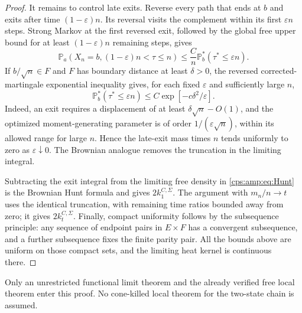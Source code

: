 \documentclass[11pt,letterpaper]{article}
\numberwithin{equation}{section}
\theoremstyle{remark}\newtheorem{remark}[theorem]{Remark}
\newcommand{\PP}{\mathbb P}
\begin{document}
\begin{proof}
It remains to control late exits. Reverse every path that ends at $b$ and exits after time $(1-\varepsilon)n$. Its reversal visits the complement within its first $\varepsilon n$ steps. Strong Markov at the first reversed exit, followed by the global free upper bound for at least $(1-\varepsilon)n$ remaining steps, gives
\begin{equation}\label{cps:amp:eq:late}
 \PP_a(X_n=b,(1-\varepsilon)n<\tau\le n)
 \le\frac Cn\PP_b^*(\tau^*\le\varepsilon n).
\end{equation}
If $b/\sqrt n\in F$ and $F$ has boundary distance at least $\delta>0$, the reversed corrected-martingale exponential inequality gives, for each fixed $\varepsilon$ and sufficiently large $n$,
\begin{equation}\label{cps:amp:eq:earlyexit}
 \PP_b^*(\tau^*\le\varepsilon n)
 \le C\exp[-c\delta^2/\varepsilon].
\end{equation}
Indeed, an exit requires a displacement of at least $\delta\sqrt n-O(1)$, and the optimized moment-generating parameter is of order $1/(\varepsilon\sqrt n)$, within its allowed range for large $n$. Hence the late-exit mass times $n$ tends uniformly to zero as $\varepsilon\downarrow0$. The Brownian analogue removes the truncation in the limiting integral.

Subtracting the exit integral from the limiting free density in \eqref{cps:amp:eq:Hunt} is the Brownian Hunt formula and gives $2k_1^{C,\Sigma}$. The argument with $m_n/n\to t$ uses the identical truncation, with remaining time ratios bounded away from zero; it gives $2k_t^{C,\Sigma}$. Finally, compact uniformity follows by the subsequence principle: any sequence of endpoint pairs in $E\times F$ has a convergent subsequence, and a further subsequence fixes the finite parity pair. All the bounds above are uniform on those compact sets, and the limiting heat kernel is continuous there.
\end{proof}
Only an unrestricted functional limit theorem and the already verified free local theorem enter this proof. No cone-killed local theorem for the two-state chain is assumed.
\end{document}

